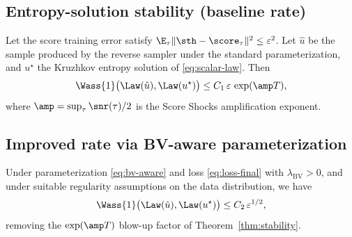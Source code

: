 \subsection{Entropy-solution stability (baseline rate)}
\label{sec:theory:stability}

\begin{theorem}
\label{thm:stability}
Let the score training error satisfy $\E_{\tau}\|\sth - \score_{\tau}\|^{2} \le \varepsilon^{2}$. Let $\hat u$ be the sample produced by the reverse sampler under the standard parameterization, and $u^{\star}$ the Kruzhkov entropy solution of \eqref{eq:scalar-law}. Then
\begin{equation}
\label{eq:thm-stability}
\Wass{1}\bigl(\Law(\hat u), \Law(u^{\star})\bigr) \le C_{1}\,\varepsilon\,\exp(\amp T),
\end{equation}
where $\amp = \sup_{\tau} \snr(\tau)/2$ is the Score Shocks amplification exponent.
\end{theorem}


\subsection{Improved rate via BV-aware parameterization}
\label{sec:theory:improved-rate}

\begin{theorem}
\label{thm:improved-rate}
Under parameterization \eqref{eq:bv-aware} and loss \eqref{eq:loss-final} with $\lambda_{\mathrm{BV}} > 0$, and under suitable regularity assumptions on the data distribution, we have
\begin{equation}
\label{eq:thm-improved}
\Wass{1}\bigl(\Law(\hat u), \Law(u^{\star})\bigr) \le C_{2}\,\varepsilon^{1/2},
\end{equation}
removing the $\exp(\amp T)$ blow-up factor of Theorem~\ref{thm:stability}.
\end{theorem}

